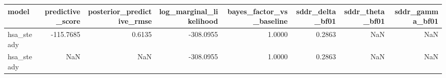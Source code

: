 \begin{tabular}{lrrrrrrr}
\toprule
model & predictive\_score & posterior\_predictive\_rmse & log\_marginal\_likelihood & bayes\_factor\_vs\_baseline & sddr\_delta\_bf01 & sddr\_theta\_bf01 & sddr\_gamma\_bf01 \\
\midrule
hsa\_steady & -115.7685 & 0.6135 & -308.0955 & 1.0000 & 0.2863 & NaN & NaN \\
hsa\_steady & NaN & NaN & -308.0955 & 1.0000 & 0.2863 & NaN & NaN \\
\bottomrule
\end{tabular}

